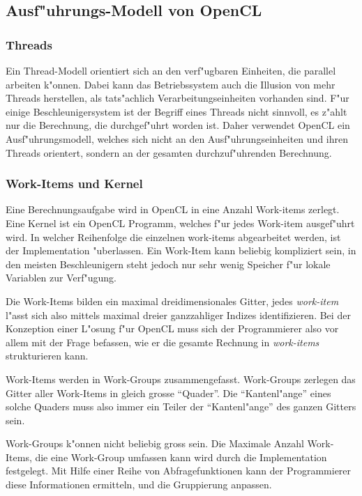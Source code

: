 \subsection{Ausf"uhrungs-Modell von OpenCL}
\subsubsection{Threads}
Ein Thread-Modell orientiert sich an den verf"ugbaren Einheiten, die
parallel arbeiten k"onnen.
Dabei kann das Betriebssystem auch die Illusion von mehr Threads
herstellen, als tats"achlich Verarbeitungseinheiten vorhanden sind.
F"ur einige Beschleunigersystem ist der Begriff eines Threads nicht
sinnvoll, es z"ahlt nur die Berechnung, die durchgef"uhrt worden ist.
Daher verwendet OpenCL ein Ausf"uhrungsmodell, welches sich nicht
an den Ausf"uhrungseinheiten und ihren Threads orientert, sondern an
der gesamten durchzuf"uhrenden Berechnung.

\subsubsection{Work-Items und Kernel}
Eine Berechnungsaufgabe wird in OpenCL in eine Anzahl Work-items
zerlegt.
Eine Kernel ist ein OpenCL Programm, welches f"ur jedes Work-item
ausgef"uhrt wird.
In welcher Reihenfolge die einzelnen work-items abgearbeitet werden,
ist der Implementation "uberlassen.
Ein Work-Item kann beliebig kompliziert sein, in den meisten Beschleunigern
steht jedoch nur sehr wenig Speicher f"ur lokale Variablen zur Verf"ugung.

Die Work-Items bilden ein maximal dreidimensionales Gitter, jedes
{\em work-item} l"asst sich also mittels maximal dreier ganzzahliger 
Indizes identifizieren.
Bei der Konzeption einer L"osung f"ur OpenCL muss sich der
Programmierer also vor allem mit der Frage befassen, wie er die
gesamte Rechnung in {\em work-items} strukturieren kann. 

Work-Items werden in Work-Groups zusammengefasst.
Work-Groups zerlegen das Gitter aller Work-Items in gleich grosse ``Quader''.
Die ``Kantenl"ange'' eines solche Quaders muss also immer ein Teiler
der  ``Kantenl"ange'' des ganzen Gitters sein.

Work-Groups k"onnen nicht beliebig gross sein.
Die Maximale Anzahl Work-Items, die eine Work-Group umfassen kann
wird durch die Implementation festgelegt. 
Mit Hilfe einer Reihe von Abfragefunktionen kann der Programmierer
diese Informationen ermitteln, und die Gruppierung anpassen.

